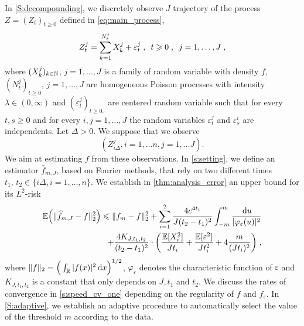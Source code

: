 In \cref{S:decompounding}, we discretely observe $J$ trajectory of the process
 $Z = (Z_t)_{t \geq 0}$ defined in \cref{eq:main_process}, \ie
    \begin{equation*}
        Z_t^j
        = \sum^{N_t^j}_{k = 1}X_k^j + \varepsilon_t^j
        \; , \enspace
        t \geqslant 0
        \; , \enspace 
        j = 1,\ldots,J
        \; ,
    \end{equation*}
where $(X_k^j)_{k \in \mathbb{N}}$, $j = 1, \ldots, J$ is a family of \iid random variable with density $f$, $(N^j_t)_{t\geq0}$, $j = 1, \ldots, J$ are homogeneous Poisson processes with intensity $\lambda \in (0, \infty)$ and $(\varepsilon^j_t)_{t \geq 0, }$ are \iid centered random variable such that for every $t,s \geq 0$ and for every $i,j = 1, \ldots, J$ the random variables $\varepsilon^j_t$ and $\varepsilon^i_s$ are independents. Let $\Delta > 0$. We suppose that we observe $$(Z_{i\Delta}^j, i = 1, \ldots n, j = 1, \ldots J).$$ We aim at estimating $f$ from these observations. In \cref{s:setting}, we define an estimator $\hat f_{m,J}$, based on Fourier methods, that rely on two different times $t_1, \, t_2 \in \{i\Delta, i = 1, \ldots, n\}$. We establish in \cref{thm:analysis_error} an upper bound for its $L^2$-risk
\begin{equation*}
    \begin{split}
    \mathbb{E} \Big(\lVert\widehat f_{m, J} - f \rVert_2^2 \Big)
    \leqslant  \lVert f_m - f\rVert_2^2 
		+ \sum_{i = 1}^2 \frac{4 e^{4t_i}}{J (t_2 - t_1)^2} \int_{-m}^{m} \frac{\, \mathrm du}{|\varphi_{\varepsilon}(u)|^2}
		\\     
		+\frac{4 K_{J, t_1, t_2}}{(t_2 - t_1)^2} 
	    \cdot \bigg( \frac{\mathbb{E}[X_i^2]}{J t_i} 
		+ \frac{\mathbb{E}[\varepsilon^2]}{J t_i^2} + 4 \frac{m}{(J t_i)^2} \bigg)
  \; ,
    \end{split}
	\end{equation*}
 where $\lVert f\rVert_2 = \Big(\int_{\mathbb{R}} |f(x)|^2 \,\mathrm{d} x \Big)^{1/2}$, $\varphi_\varepsilon$ denotes the characteristic function of $\varepsilon$ and $K_{J, t_1, t_2}$ is a constant that only depends on $J,t_1$ and $t_2$.  We discuss the rates of convergence in \cref{s:speed_cv_one}  depending on the regularity of $f$ and $f_\varepsilon$. In \cref{S:adaptive}, we establish an adaptive procedure to automatically select the value of the threshold $m$ according to the data. \\

